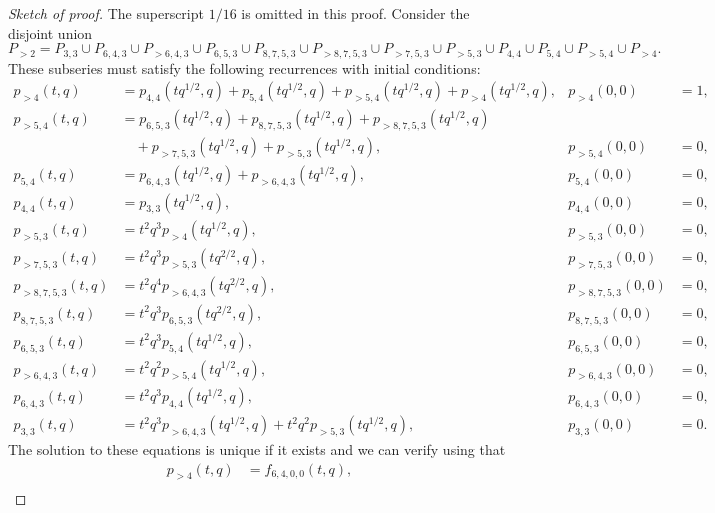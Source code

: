 \documentclass[a4paper, 12pt, reqno]{amsart}
\theoremstyle{remark}
\begin{document}
\begin{proof}[Sketch of proof]
  The superscript $1/16$ is omitted in this proof.
  Consider the disjoint union
  \begin{equation*}
    P_{>2} = P_{3, 3} \cup P_{6, 4, 3} \cup P_{>6, 4, 3} \cup P_{6, 5, 3} \cup P_{8, 7, 5, 3} \cup P_{>8, 7, 5, 3} \cup P_{>7, 5, 3} \cup P_{>5, 3} \cup P_{4, 4} \cup P_{5, 4} \cup P_{>5, 4} \cup P_{>4}.
  \end{equation*}
  These subseries must satisfy the following recurrences with initial conditions:
  \begin{align*}
    p_{>4}(t, q) &= p_{4, 4} (tq^{1/2}, q) + p_{5, 4}(tq^{1/2}, q) + p_{>5, 4}(tq^{1/2}, q) + p_{>4}(tq^{1/2}, q), &p_{>4}(0, 0) &= 1, \\
    p_{>5, 4}(t, q) &= p_{6, 5, 3}(tq^{1/2}, q) + p_{8, 7, 5, 3}(tq^{1/2}, q) + p_{>8, 7, 5, 3}(tq^{1/2}, q) \\
    &\quad + p_{>7, 5, 3}(tq^{1/2}, q) + p_{>5, 3}(tq^{1/2}, q), &p_{>5, 4}(0, 0) &= 0, \\
    p_{5, 4}(t, q) &= p_{6, 4, 3}(tq^{1/2}, q) + p_{>6, 4, 3}(tq^{1/2}, q), &p_{5, 4}(0, 0) &= 0, \\
    p_{4, 4}(t, q) &= p_{3, 3}(tq^{1/2}, q), &p_{4, 4}(0, 0) &= 0, \\
    p_{>5, 3}(t, q) &= t^2q^3p_{>4}(tq^{1/2}, q), &p_{>5, 3}(0, 0) &= 0, \\
    p_{>7, 5, 3}(t, q) &= t^2q^3p_{>5, 3}(tq^{2/2}, q), &p_{>7, 5, 3}(0, 0) &= 0, \\
    p_{>8, 7, 5, 3}(t, q) &= t^2q^4p_{>6, 4, 3}(tq^{2/2}, q), &p_{>8, 7, 5, 3}(0, 0) &= 0, \\
    p_{8, 7, 5, 3}(t, q) &= t^2q^3p_{6, 5, 3}(tq^{2/2}, q), &p_{8, 7, 5, 3}(0, 0) &= 0, \\
    p_{6, 5, 3}(t, q) &= t^2q^3p_{5, 4}(tq^{1/2}, q), &p_{6, 5, 3}(0, 0) &= 0, \\
    p_{>6, 4, 3}(t, q) &= t^2q^2p_{>5, 4}(tq^{1/2}, q), &p_{>6, 4, 3}(0, 0) &= 0, \\
    p_{6, 4, 3}(t, q) &= t^2q^3p_{4, 4}(tq^{1/2}, q), &p_{6, 4, 3}(0, 0) &= 0, \\
    p_{3, 3}(t, q) &= t^2q^3p_{>6, 4, 3}(tq^{1/2}, q) + t^2q^2p_{>5, 3}(tq^{1/2}, q), &p_{3, 3}(0, 0) &= 0.
  \end{align*}
  The solution to these equations is unique if it exists and we can verify using  that
  \begin{align*}
    p_{>4}(t, q) &= f_{6, 4, 0, 0}(t, q), \\

\end{align*}
\end{proof}
\end{document}
